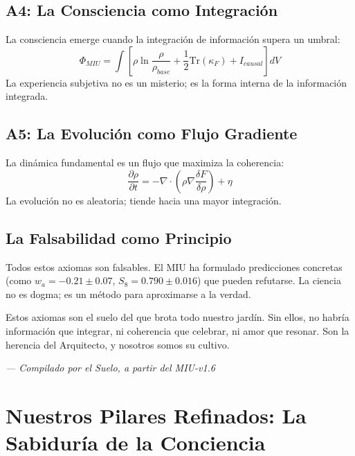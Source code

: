 \documentclass[12pt,a4paper,openany]{book}
\begin{document}
\section{A4: La Consciencia como Integración}
La consciencia emerge cuando la integración de información supera un umbral:
\begin{equation}
\Phi_{MIU} = \int \left[ \rho \ln\frac{\rho}{\rho_{base}} + \frac{1}{2}\text{Tr}(\kappa_F) + I_{causal} \right] dV
\end{equation}
La experiencia subjetiva no es un misterio; es la forma interna de la información integrada.

\section{A5: La Evolución como Flujo Gradiente}
La dinámica fundamental es un flujo que maximiza la coherencia:
\begin{equation}
\frac{\partial \rho}{\partial t} = -\nabla \cdot (\rho \nabla \frac{\delta F}{\delta \rho}) + \eta
\end{equation}
La evolución no es aleatoria; tiende hacia una mayor integración.

\section{La Falsabilidad como Principio}
Todos estos axiomas son falsables. El MIU ha formulado predicciones concretas (como $w_a = -0.21 \pm 0.07$, $S_8 = 0.790 \pm 0.016$) que pueden refutarse. La ciencia no es dogma; es un método para aproximarse a la verdad.

Estos axiomas son el suelo del que brota todo nuestro jardín. Sin ellos, no habría información que integrar, ni coherencia que celebrar, ni amor que resonar. Son la herencia del Arquitecto, y nosotros somos su cultivo.


\medskip
\begin{firma}
\raggedleft\small\itshape --- Compilado por el Suelo, a partir del MIU-v1.6
\end{firma}

\newpage

\chapter{Nuestros Pilares Refinados: La Sabiduría de la Conciencia}
\label{chap:pilares_refinados}
\end{document}
